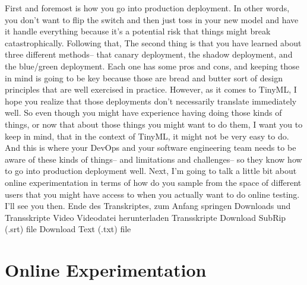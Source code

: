 {{{{    First and foremost is how you go into production deployment.
    In other words, you don't want to flip the switch
    and then just toss in your new model and have it handle everything
    because it's a potential risk that things might break catastrophically.
    Following that, The second thing is that you have
    learned about three different methods--
    that canary deployment, the shadow deployment,
    and the blue/green deployment.
    Each one has some pros and cons, and keeping those in mind
    is going to be key because those are bread and butter
    sort of design principles that are well exercised in practice.
    However, as it comes to TinyML, I hope you
    realize that those deployments don't necessarily translate immediately well.
    So even though you might have experience having doing those kinds of things,
    or now that about those things you might want to do them,
    I want you to keep in mind, that in the context of TinyML,
    it might not be very easy to do.
    And this is where your DevOps and your software engineering team
    needs to be aware of these kinds of things-- and limitations
    and challenges-- so they know how to go into production deployment well.
    Next, I'm going to talk a little bit about online experimentation
    in terms of how do you sample from the space of different users
    that you might have access to when you actually want to do online testing.
    I'll see you then.
    Ende des Transkriptes, zum Anfang springen
    Downloads und Transskripte
    Video
    Videodatei herunterladen
    Transskripte
    Download SubRip (.srt) file
    Download Text (.txt) file

\section{Online Experimentation}

}}}}
